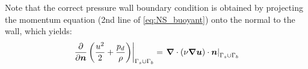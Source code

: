 Note that the correct pressure wall boundary condition is obtained by projecting the momentum equation (2nd line of \eqref{eq:NS_buoyant}) onto the normal to the wall, which yields:
\begin{equation}\label{eq:wallBCs_p}
  \left.\dfrac{\partial}{\partial \bm{n}}\left(\dfrac{u^2}{2} + \dfrac{p_d}{\rho}\right)\right|_{\Gamma_s\cup\Gamma_b} =
  \left.\bm{\nabla} \cdot \left(\nu \bm{\nabla} \bm{u}\right) \cdot \bm{n}\right|_{\Gamma_s\cup\Gamma_b}
\end{equation}


